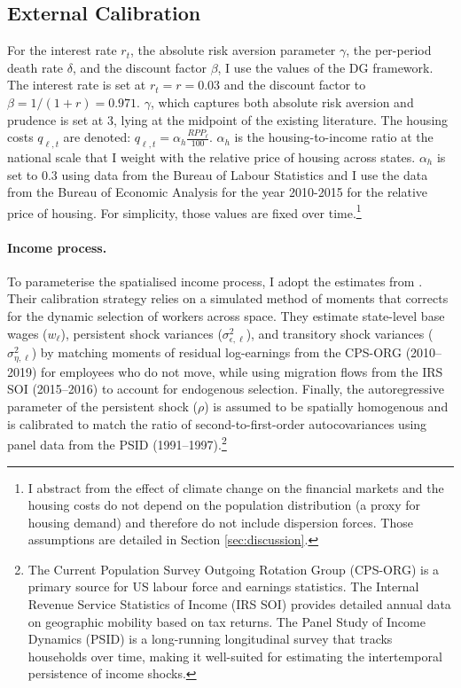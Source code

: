\documentclass[12pt, a4paper]{article}
\begin{document}

\subsection{External Calibration}
For the interest rate $r_t$, the absolute risk aversion parameter $\gamma$, the per-period death rate $\delta$, and the discount factor $\beta$, I use the values of the DG framework. The interest rate is set at $r_t = r = 0.03$ and the discount factor to $\beta = 1/(1+r) = 0.971$. $\gamma$, which captures both absolute risk aversion and prudence is set at 3, lying at the midpoint of the existing literature. The housing costs $q_{\ell, t}$ are denoted: $q_{\ell, t} = \alpha_h \frac{RPP_\ell}{100}$. $\alpha_h$ is the housing-to-income ratio at the national scale that I weight with the relative price of housing across states. $\alpha_h$ is set to 0.3 using data from the Bureau of Labour Statistics and I use the data from the Bureau of Economic Analysis for the year 2010-2015 for the relative price of housing. For simplicity, those values are fixed over time.\footnote{I abstract from the effect of climate change on the financial markets and the housing costs do not depend on the population distribution (a proxy for housing demand) and therefore do not include dispersion forces. Those assumptions are detailed in Section \ref{sec:discussion}.} 
\paragraph{Income process.} To parameterise the spatialised income process, I adopt the estimates from \citet{dvorkin_geography_2025}. Their calibration strategy relies on a simulated method of moments that corrects for the dynamic selection of workers across space. They estimate state-level base wages ($w_\ell$), persistent shock variances ($\sigma_{\epsilon,\ell}^2$), and transitory shock variances ($\sigma_{\eta,\ell}^2$) by matching moments of residual log-earnings from the CPS-ORG (2010--2019) for employees who do not move, while using migration flows from the IRS SOI (2015--2016) to account for endogenous selection. Finally, the autoregressive parameter of the persistent shock ($\rho$) is assumed to be spatially homogenous and is calibrated to match the ratio of second-to-first-order autocovariances using panel data from the PSID (1991--1997).\footnote{The Current Population Survey Outgoing Rotation Group (CPS-ORG) is a primary source for US labour force and earnings statistics. The Internal Revenue Service Statistics of Income (IRS SOI) provides detailed annual data on geographic mobility based on tax returns. The Panel Study of Income Dynamics (PSID) is a long-running longitudinal survey that tracks households over time, making it well-suited for estimating the intertemporal persistence of income shocks.}
\end{document}
